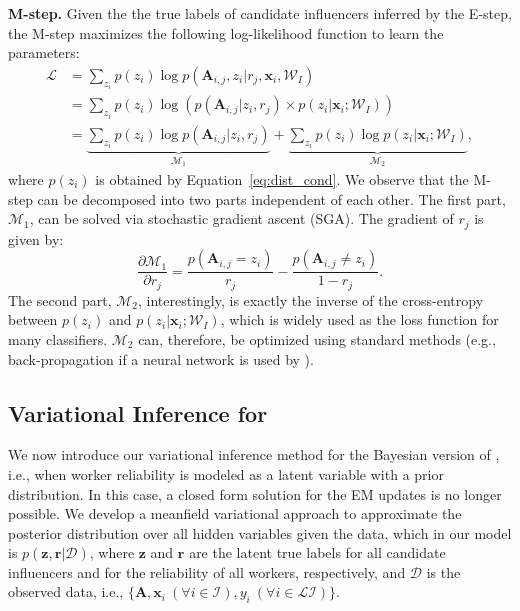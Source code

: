 \smallskip
\noindent\textbf{M-step.}
Given the the true labels of candidate influencers inferred by the E-step, the M-step maximizes the following log-likelihood function to learn the parameters:
\begin{align}
   \mathcal{L} 
    &=\sum_{z_i}p(z_i)\log p(\mathbf{A}_{i,j},z_i|r_j,\mathbf{x}_i,\mathcal{W}_I)\nonumber\\
    &=\sum_{z_i}p(z_i)\log (p(\mathbf{A}_{i,j}| z_i , r_j) \times p(z_i |\mathbf{x}_i;\mathcal{W}_I)) \label{eq:likelihood_m}\\
    &=\underbrace{\sum_{z_i}p(z_i) \log p(\mathbf{A}_{i,j}| z_i , r_j)}_{\mathcal{M}_1}
    +\underbrace{\sum_{z_i}p(z_i)\log p(z_i |\mathbf{x}_i;\mathcal{W}_I)}_{\mathcal{M}_2},
    \nonumber
\end{align}
where $p(z_i)$ is obtained by Equation~\ref{eq:dist_cond}. We observe that the M-step can be decomposed into two parts independent of each other. The first part, $\mathcal{M}_1$, can be solved via stochastic gradient ascent (SGA). The gradient of $r_j$ is given by:
%
\begin{equation}
    \frac{\partial \mathcal{M}_1}{\partial r_j}=\frac{p(\mathbf{A}_{i,j}=z_i)}{r_j}-\frac{p(\mathbf{A}_{i,j}\neq z_i)}{1-r_j}.
    \label{eq:grad_rj}
\end{equation}
%
The second part, $\mathcal{M}_2$, interestingly, is exactly the inverse of the cross-entropy between $p(z_i)$ and $p(z_i |\mathbf{x}_i;\mathcal{W}_I)$, which is widely used as the loss function for many classifiers. $\mathcal{M}_2$ can, therefore, be optimized using standard methods (e.g., back-propagation if a neural network is used by \sys).

\subsection{Variational Inference for \sys}
\label{sec:vi}

We now introduce our variational inference method for the Bayesian version of \sys, i.e., when worker reliability is modeled as a latent variable with a prior distribution. In this case, a closed form solution for the EM updates is no longer possible. We develop a meanfield variational approach to approximate the posterior distribution over all hidden variables given the data, which in our model is $p(\mathbf{z},\mathbf{r} | \mathcal{D})$, where $\mathbf{z}$ and $\mathbf{r}$ are the latent true labels for all candidate influencers and for the reliability of all workers, respectively, and $\mathcal{D}$ is the observed data, i.e., $\{\mathbf{A}, \mathbf{x}_i\ (\forall i\in\mathcal{I}), y_i\ (\forall i\in \mathcal{LI})\}$. 

